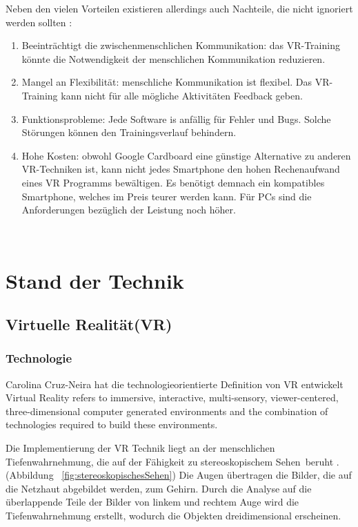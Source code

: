 Neben den vielen Vorteilen existieren allerdings auch Nachteile, die nicht ignoriert werden sollten \citep{17}:

\begin{enumerate}
\item Beeinträchtigt die zwischenmenschlichen Kommunikation: das VR-Training könnte die Notwendigkeit der menschlichen Kommunikation reduzieren.
\item Mangel an Flexibilität: menschliche Kommunikation ist flexibel. Das VR-Training kann nicht für alle mögliche Aktivitäten Feedback geben.
\item Funktionsprobleme: Jede Software is anfällig für Fehler und Bugs. Solche Störungen können den Trainingsverlauf behindern.
\item Hohe Kosten: obwohl Google Cardboard eine günstige Alternative zu anderen VR-Techniken ist, kann nicht jedes Smartphone den hohen Rechenaufwand eines VR Programms bewältigen. Es benötigt demnach ein kompatibles Smartphone, welches im Preis teurer werden kann. Für PCs sind die Anforderungen bezüglich der Leistung noch höher.
\end{enumerate}\

\section{Stand der Technik}
 \subsection{Virtuelle Realität(VR)}
  \subsubsection{Technologie}
Carolina Cruz-Neira hat die technologieorientierte Definition von VR entwickelt \glqq Virtual Reality refers to immersive, interactive, multi-sensory, viewer-centered, three-dimensional computer generated environments and the combination of technologies required to build these environments.\grqq\ \citep{19}
  
Die Implementierung der VR Technik liegt an der menschlichen Tiefenwahrnehmung, die auf der Fähigkeit zu \glqq stereoskopischem Sehen\grqq\ beruht \citep{20}. (Abbildung ~\ref{fig:stereoskopischesSehen}) Die Augen übertragen die Bilder, die auf die Netzhaut abgebildet werden, zum Gehirn. Durch die Analyse auf die überlappende Teile der Bilder von linkem und rechtem Auge wird die Tiefenwahrnehmung erstellt, wodurch die Objekten dreidimensional erscheinen.

